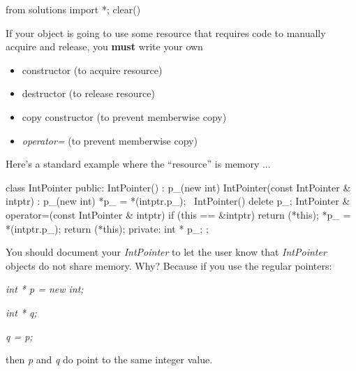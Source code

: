 \begin{python0}
from solutions import *; clear()
\end{python0}

If your object is going to use some resource that requires code to
manually acquire and release, you \textbf{must} write your own

\begin{itemize}
\item constructor (to acquire resource)
\item destructor (to release resource)
\item copy constructor (to prevent memberwise copy)
\item \textit{operator=} (to prevent memberwise copy)
\end{itemize}

Here's a standard example where the ``resource'' is
memory ...

\begin{consolethree}[escapeinside=||]
class IntPointer
{
public:
    IntPointer()
        : p_(new int)
    {}
    IntPointer(const IntPointer & intptr)
        : p_(new int)
    {
        *p_ = *(intptr.p_);
    }
    ~IntPointer() { delete p_; }
    IntPointer & operator=(const IntPointer & intptr)
    {
        if (this == &intptr)
        {
            return (*this);
        }
        *p_ = *(intptr.p_);
        return (*this);
    }
private:
    int * p_;
};
\end{consolethree}

You should document your \textit{IntPointer} to let the user know that
\textit{IntPointer} objects do not share memory. Why? Because if you use
the regular pointers:

\textit{int * p = new int;}

\textit{int * q;}

\textit{q = p;}

then \textit{p} and \textit{q} do point to the same integer value.




